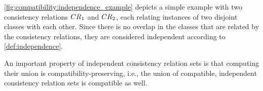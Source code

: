 \begin{example}
\autoref{fig:compatibility:independence_example} depicts a simple example with two consistency relations $\consistencyrelation{CR}{1}$ and $\consistencyrelation{CR}{2}$, each relating instances of two disjoint classes with each other.
Since there is no overlap in the classes that are related by the consistency relations, they are considered independent according to \autoref{def:independence}.
\end{example}

An important property of independent consistency relation sets is that computing their union is compatibility-preserving, i.e., the union of compatible, independent consistency relation sets is compatible as well.


